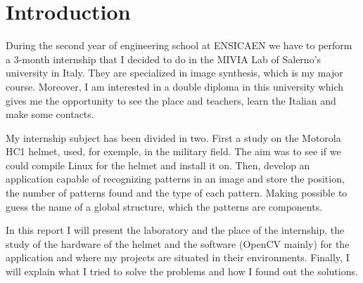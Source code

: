 \chapter{Introduction}

\par During the second year of engineering school at ENSICAEN we have to perform a 3-month internship that I decided to do in the MIVIA Lab of Salerno's university in Italy. They are specialized in image synthesis, which is my major course. Moreover, I am interested in a double diploma in this university which gives me the opportunity to see the place and teachers, learn the Italian and make some contacts.
\par My internship subject has been divided in two. First a study on the Motorola HC1 helmet, used, for exemple, in the military field. The aim was to see if we could compile Linux for the helmet and install it on. Then, develop an application capable of recognizing patterns in an image and store the position, the number of patterns found and the type of each pattern. Making possible to guess the name of a global structure, which the patterns are components.
\par In this report I will present the laboratory and the place of the internship, the study of the hardware of the helmet and the software (OpenCV mainly) for the application and where my projects are situated in their environments. Finally, I will explain what I tried to solve the problems and how I found out the solutions.